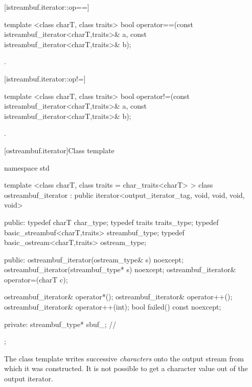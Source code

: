 [istreambuf.iterator::op==]{}

%
\begin{itemdecl}
template <class charT, class traits>
  bool operator==(const istreambuf_iterator<charT,traits>& a,
                  const istreambuf_iterator<charT,traits>& b);
\end{itemdecl}

\begin{itemdescr}
\pnum
\returns
{}.
\end{itemdescr}

[istreambuf.iterator::op!=]{}

%
\begin{itemdecl}
template <class charT, class traits>
  bool operator!=(const istreambuf_iterator<charT,traits>& a,
                  const istreambuf_iterator<charT,traits>& b);
\end{itemdecl}

\begin{itemdescr}
\pnum
\returns
{}.
\end{itemdescr}

[ostreambuf.iterator]{Class template }

%
\begin{codeblock}
namespace std {
  template <class charT, class traits = char_traits<charT> >
  class ostreambuf_iterator :
    public iterator<output_iterator_tag, void, void, void, void> {
  public:
    typedef charT                         char_type;
    typedef traits                        traits_type;
    typedef basic_streambuf<charT,traits> streambuf_type;
    typedef basic_ostream<charT,traits>   ostream_type;

  public:
    ostreambuf_iterator(ostream_type& s) noexcept;
    ostreambuf_iterator(streambuf_type* s) noexcept;
    ostreambuf_iterator& operator=(charT c);

    ostreambuf_iterator& operator*();
    ostreambuf_iterator& operator++();
    ostreambuf_iterator& operator++(int);
    bool failed() const noexcept;

  private:
    streambuf_type* sbuf_;                // \expos
  };
}
\end{codeblock}

\pnum
The
class template
writes successive
\textit{characters}
onto the output stream from which it was constructed.
It is not possible to get a character value out of the output iterator.

